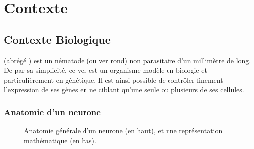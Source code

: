 \chapter{Contexte} %
\label{cha:Contexte}




\section{Contexte Biologique} %
\label{sec:Contexte Biologique}

\caeleg{} (abrégé \celeg{}) est un nématode (ou ver rond) non parasitaire d'un
millimètre de long. De par sa simplicité, ce ver est un organisme modèle en biologie
et particulièrement en génétique. Il est ainsi possible de contrôler
finement l'expression de ses gènes en ne ciblant qu'une seule ou plusieurs de
ses cellules.

\subsection{Anatomie d'un neurone} %
\label{sub:Anatomie d'un neurone}

\begin{figure}[H]
   \begin{center}
   \end{center}
   \caption[Anatomie générale d'un neurone]{Anatomie générale d'un neurone (en
   haut), et une représentation mathématique (en bas).}
   \label{fig:neurone}
\end{figure}


